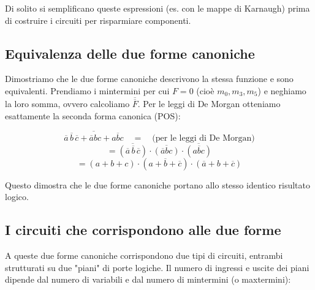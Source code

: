 \begin{note}Di solito si semplificano queste espressioni (es. con le mappe di Karnaugh) prima di costruire i circuiti per risparmiare componenti.\end{note}

\subsection{Equivalenza delle due forme canoniche}

Dimostriamo che le due forme canoniche descrivono la stessa funzione e sono equivalenti. Prendiamo i mintermini per cui $F=0$ (cioè $m_0, m_3, m_5$) e neghiamo la loro somma, ovvero calcoliamo $\overline{\overline{F}}$. Per le leggi di De Morgan otteniamo esattamente la seconda forma canonica (POS):

\[
\overline{\overline{a}\,\overline{b}\,\overline{c} + \overline{a}bc + a\overline{b}c} \quad = \quad \text{(per le leggi di De Morgan)}
\]
\[
= \overline{(\overline{a}\,\overline{b}\,\overline{c})} \cdot \overline{(\overline{a}bc)} \cdot \overline{(a\overline{b}c)}
\]
\[
= (a+b+c) \cdot (a+\overline{b}+\overline{c}) \cdot (\overline{a}+b+\overline{c})
\]

Questo dimostra che le due forme canoniche portano allo stesso identico risultato logico.

\subsection{I circuiti che corrispondono alle due forme}

A queste due forme canoniche corrispondono due tipi di circuiti, entrambi strutturati su due "piani" di porte logiche. Il numero di ingressi e uscite dei piani dipende dal numero di variabili e dal numero di mintermini (o maxtermini):


